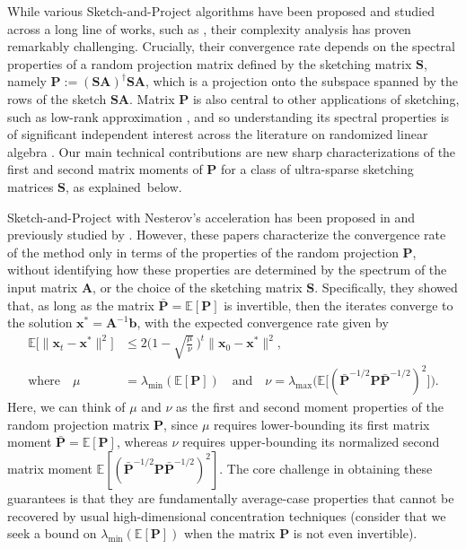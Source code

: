 \documentclass[11pt]{article}
\def\x{{\mathbf x}}
\def\b{{\mathbf b}}
\def\A{{\mathbf A}}
\def\S{{\mathbf S}}
\def\P{{\mathbf P}}
\def\E{{\mathds E}}
\begin{document}
While various Sketch-and-Project algorithms have been proposed and studied across a long line of works, such as  \cite{hanzely2018sega,necoara2019randomized,lejeune2024asymptotics,tang2023sketch}, their complexity analysis has proven remarkably challenging. Crucially, their convergence rate depends on the spectral properties of a random projection matrix defined by the sketching matrix $\S$, namely $\P := (\S\A)^\dagger\S\A$, which is a projection onto the subspace spanned by the rows of the sketch $\S\A$.  Matrix $\P$ is also central to other applications of sketching, such as low-rank approximation \cite{halko2011finding,cohen2015dimensionality,cohen2017input}, and so understanding its spectral properties is of significant independent interest across the literature on randomized linear algebra \cite{woodruff2014sketching,martinsson2020randomized}. Our main technical contributions are new sharp characterizations of the first and second matrix moments of $\P$ for a class of ultra-sparse sketching matrices $\S$, as explained~below.

Sketch-and-Project with Nesterov's acceleration has been proposed in \cite{richtarik2020stochastic} and previously studied by \cite{gower2018accelerated}. However, these papers characterize the convergence rate of the method only in terms of the properties of the random projection $\P$, without identifying how these properties are determined by the spectrum of the input matrix $\A$, or the choice of the sketching matrix $\S$. Specifically, they showed that, as long as the matrix $\bar\P=\E[\P]$ is invertible, then the iterates converge to the solution $\x^*=\A^{-1}\b$, with the expected convergence rate given by
\begin{align}
\E\big[\|\x_t-\x^*\|^2\big] &\leq 2\bigg(1-\sqrt{\frac\mu\nu}\,\bigg)^t\|\x_0-\x^*\|^2,
\label{eq:convergence-intro}
\\
\text{where}\quad    \mu &= \lambda_{\min}(\E[\P])
    \quad\text{and}\quad
    \nu = \lambda_{\max}\Big(\E\big[ (\bar\P^{-1/2}\P\bar\P^{-1/2})^2\big]\Big).\nonumber
\end{align}
Here, we can think of $\mu$ and $\nu$ as the first and second moment properties of the random projection matrix $\P$, since $\mu$ requires lower-bounding its first matrix moment $\bar\P=\E[\P]$, whereas $\nu$ requires upper-bounding its normalized second matrix moment $\E[(\bar\P^{-1/2}\P\bar\P^{-1/2})^2]$. The core challenge in obtaining these guarantees is that they are fundamentally average-case properties that cannot be recovered by usual high-dimensional concentration techniques (consider that we seek a bound on $\lambda_{\min}(\E[\P])$ when the matrix $\P$  is not even invertible).
\end{document}
